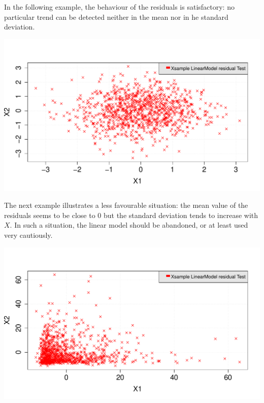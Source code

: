 {  In the following example, the behaviour of the residuals is satisfactory: no particular trend can be detected neither in the mean nor in he standard deviation.

  \begin{center}
    \includegraphics[scale=0.45]{Figures/OKlinearRegModelResidual.pdf}
  \end{center}

  The next example illustrates a less favourable situation: the mean value of the residuals seems to be close to 0 but the standard deviation tends to increase with $X$. In such a situation, the linear model should be abandoned, or at least used very cautiously.

  \begin{center}
    \includegraphics[scale=0.45]{Figures/WronglinearRegModelResidual.pdf}
  \end{center}

  \vspace{2mm}
}
{
}

